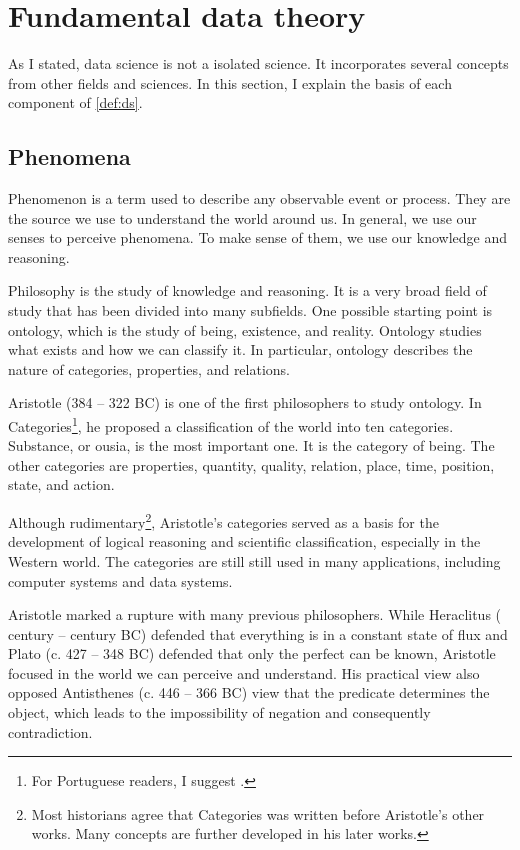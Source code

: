 \section{Fundamental data theory}

As I stated, data science is not a isolated science.  It incorporates several concepts
from other fields and sciences.  In this section, I explain the basis of each component of
\cref{def:ds}.

\subsection{Phenomena}
\label{sub:phenomena}

Phenomenon is a term used to describe any observable event or process.  They are the
source we use to understand the world around us.  In general, we use our senses to
perceive phenomena.  To make sense of them, we use our knowledge and reasoning.

Philosophy is the study of knowledge and reasoning.  It is a very broad field of study
that has been divided into many subfields.  One possible starting point is \gls{ontology},
which is the study of being, existence, and reality.  Ontology studies what exists and how
we can classify it.  In particular, ontology describes the nature of categories,
properties, and relations.

Aristotle (384 -- 322 BC) is one of the first philosophers to study ontology. In
Categories\footnote{For Portuguese readers, I suggest .}, he
proposed a classification of the world into ten categories. Substance, or ousia,
is the most important one.  It is the category of being.  The other categories
are properties, quantity, quality, relation, place, time, position, state, and action.

Although rudimentary\footnote{Most historians agree that Categories was written before
Aristotle's other works.  Many concepts are further developed in his later works.},
Aristotle's categories served as a basis for the development of logical reasoning and
scientific classification, especially in the Western world.  The categories are still
still used in many applications, including computer systems and data systems.

Aristotle marked a rupture with many previous philosophers.  While Heraclitus (
century --  century BC) defended that everything is in a constant state of flux and
Plato (c. 427 -- 348 BC) defended that only the perfect can be known, Aristotle focused in
the world we can perceive and understand.  His practical view also opposed Antisthenes (c.
446 -- 366 BC) view that the predicate determines the object, which leads to the
impossibility of negation and consequently contradiction.

